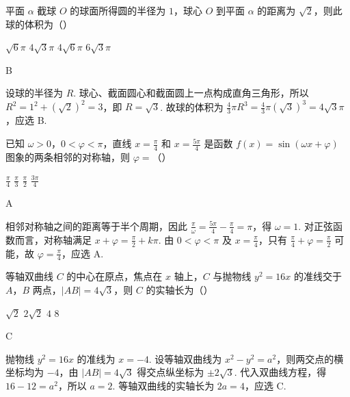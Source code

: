 \begin{problem}
平面 \(\alpha\) 截球 \(O\) 的球面所得圆的半径为 \(1\)，球心 \(O\) 到平面 \(\alpha\) 的距离为 \(\sqrt{2}\)，则此球的体积为（\quad）

\choices
    {\(\sqrt{6}\pi\)}
    {\(4\sqrt{3}\pi\)}
    {\(4\sqrt{6}\pi\)}
    {\(6\sqrt{3}\pi\)}

\begin{answer}
B
\end{answer}

\begin{solution}
设球的半径为 \(R\). 球心、截面圆心和截面圆上一点构成直角三角形，所以 \(R^2=1^2+(\sqrt2)^2=3\)，即 \(R=\sqrt3\). 故球的体积为 \(\frac43\pi R^3=\frac43\pi(\sqrt3)^3=4\sqrt3\pi\)，应选 B.
\end{solution}
\end{problem}

\begin{problem}
已知 \(\omega > 0\)，\(0 < \varphi < \pi\)，直线 \(x = \frac{\pi}{4}\) 和 \(x = \frac{5\pi}{4}\) 是函数 \(f(x) = \sin (\omega x + \varphi)\) 图象的两条相邻的对称轴，则 \(\varphi =\)（\quad）

\choices
    {\( \frac{\pi}{4} \)}
    {\( \frac{\pi}{3} \)}
    {\( \frac{\pi}{2} \)}
    {\( \frac{3\pi}{4} \)}

\begin{answer}
A
\end{answer}

\begin{solution}
相邻对称轴之间的距离等于半个周期，因此 \(\frac{\pi}{\omega}=\frac{5\pi}{4}-\frac{\pi}{4}=\pi\)，得 \(\omega=1\). 对正弦函数而言，对称轴满足 \(x+\varphi=\frac\pi2+k\pi\). 由 \(0<\varphi<\pi\) 及 \(x=\frac\pi4\)，只有 \(\frac\pi4+\varphi=\frac\pi2\) 可能，故 \(\varphi=\frac\pi4\)，应选 A.
\end{solution}
\end{problem}

\begin{problem}
等轴双曲线 \(C\) 的中心在原点，焦点在 \(x\) 轴上，\(C\) 与抛物线 \(y^{2} = 16x\) 的准线交于 \(A\)，\(B\) 两点，\(|AB| = 4\sqrt{3}\)，则 \(C\) 的实轴长为（\quad）

\choices
    {\(\sqrt{2}\)}
    {\(2\sqrt{2}\)}
    {\(4\)}
    {\(8\)}

\begin{answer}
C
\end{answer}

\begin{solution}
抛物线 \(y^2=16x\) 的准线为 \(x=-4\). 设等轴双曲线为 \(x^2-y^2=a^2\)，则两交点的横坐标均为 \(-4\)，由 \(|AB|=4\sqrt3\) 得交点纵坐标为 \(\pm2\sqrt3\). 代入双曲线方程，得 \(16-12=a^2\)，所以 \(a=2\). 等轴双曲线的实轴长为 \(2a=4\)，应选 C.
\end{solution}
\end{problem}


